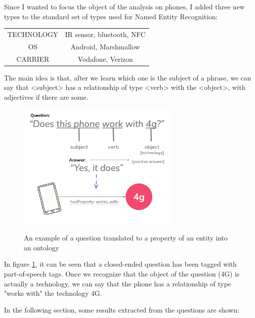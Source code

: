 \documentclass[LaM,oneside,binding=0.6cm]{sapthesis}
\begin{document}
Since I wanted to focus the object of the analysis on phones, I added three new types to the standard set of types used for Named Entity Recognition:

\begin{center}
\begin{tabular}{ c c }
TECHNOLOGY &	IR sensor, bluetooth, NFC \\
OS 	& Android, Marshmallow  \\
CARRIER &	Vodafone, Verizon \\
\end{tabular}
\end{center}

\bigskip

The main idea is that, after we learn which one is the subject of a phrase, we can say that <subject> has a relationship of type <verb> with the <object>, with adjectives if there are some.

\begin{figure}
\centering
\includegraphics[width=0.7\textwidth]{pictures/question.png}\\[3ex]
\caption{An example of a question translated to a property of an entity into an ontology}
\label{fig:question-analysis}
\end{figure}

In figure \ref{fig:question-analysis}, it can be seen that a closed-ended question has been tagged with part-of-speech tags. Once we recognize that the object of the question (4G) is actually a technology, we can say that the phone has a relationship of type "works with" the technology 4G.

In the following section, some results extracted from the questions are shown:
\end{document}
